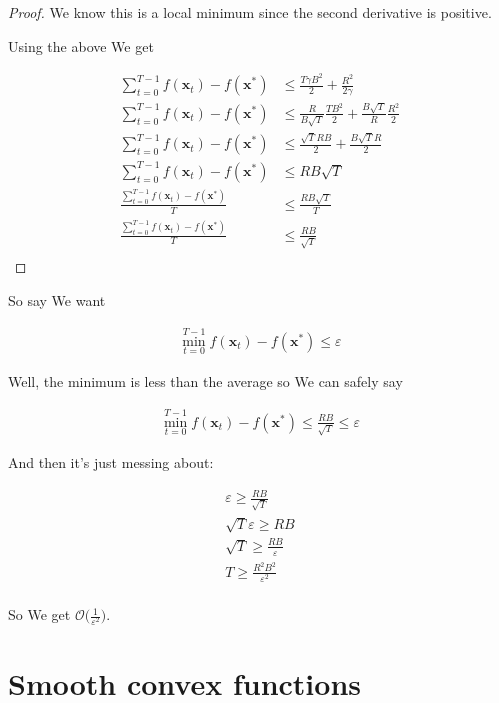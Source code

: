 \documentclass{article}
\begin{document}
\begin{proof}
		We know this is a local minimum since the second derivative is positive. 
		
		Using the above We get
		
		\begin{align*}
			\sum^{T-1}_{t=0}f(\mathbf{x}_t) - f(\mathbf{x}^*) &\le  \frac{T \gamma B^2}{2}  + \frac{R^2}{2\gamma} \\
			\sum^{T-1}_{t=0}f(\mathbf{x}_t) - f(\mathbf{x}^*) &\le  \frac{R}{B\sqrt{T} }\frac{T B^2}{2}  + \frac{B\sqrt{T} }{R}\frac{R^2}{2} \\
			\sum^{T-1}_{t=0}f(\mathbf{x}_t) - f(\mathbf{x}^*) &\le \frac{\sqrt{T}R B}{2}  + \frac{B\sqrt{T} R}{2}\\
			\sum^{T-1}_{t=0}f(\mathbf{x}_t) - f(\mathbf{x}^*) &\le RB\sqrt{T}\\
			\frac{\sum^{T-1}_{t=0}f(\mathbf{x}_t) - f(\mathbf{x}^*)}{T} &\le \frac{RB\sqrt{T}}{T}\\
			\frac{\sum^{T-1}_{t=0}f(\mathbf{x}_t) - f(\mathbf{x}^*)}{T} &\le \frac{RB}{\sqrt{T}}\\
		\end{align*}
	\end{proof}

	So say We want
	
	\begin{align*}
		\min^{T-1}_{t=0} f(\mathbf{x}_t) - f(\mathbf{x}^*) \le \varepsilon
	\end{align*}
	
	Well, the minimum is less than the average so We can safely say 

	\begin{align*}
		\min^{T-1}_{t=0} f(\mathbf{x}_t) - f(\mathbf{x}^*)  \le \frac{RB}{\sqrt{T}}  \le \varepsilon
	\end{align*}
	
	And then it's just messing about:
	
	\begin{align*}
		\varepsilon \ge \frac{RB}{\sqrt{T}}\\
		\sqrt{T}\varepsilon \ge RB\\
		\sqrt{T} \ge \frac{RB}{\varepsilon}\\
		T \ge \frac{R^2B^2}{\varepsilon^2}\\
	\end{align*}
	
	So We get $\mathcal{O}\big(\frac{1}{\varepsilon^2}\big)$.

\section{Smooth convex functions}
\end{document}

